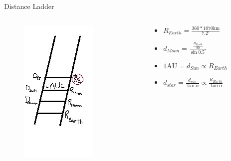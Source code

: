 \documentclass[12pt]{beamer}
\begin{document}
        \begin{frame}{Distance Ladder}
            \begin{columns}
                \begin{column}{0.5\linewidth}
                    \begin{figure}
                        \includegraphics{distanceladder3.jpg}
                    \end{figure}
                \end{column}
                \begin{column}{0.5\linewidth}
                    \begin{itemize}
                        \item $R_{Earth}=\frac{360*1070\mathrm{km}}{7.2^\circ}$
                        \item $d_{Moon}=\frac{\frac{R_{Earth}}{90}}{\sin{0.5^\circ}}$
                        \item $\mathrm{1AU}=d_{Sun}\propto{R_{Earth}}$
                        \item $d_{star}=\frac{d_{sun}}{\tan\alpha}\propto\frac{R_{Earth}}{\tan\alpha}$
                    \end{itemize}
                \end{column}
            \end{columns}
        \end{frame}
\end{document}
